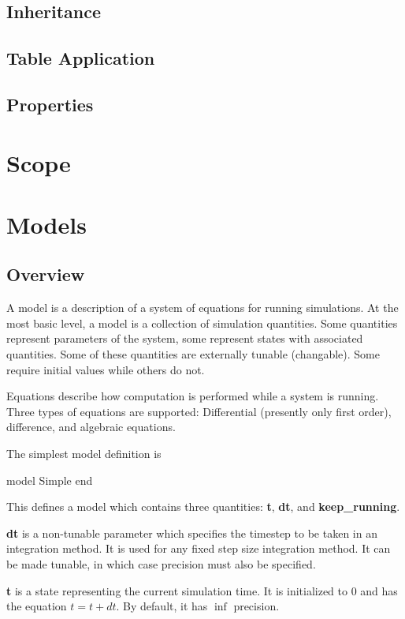 \documentclass[11pt]{article}
\begin{document}
\subsection{Inheritance}
\subsection{Table Application}
\subsection{Properties}
\newpage
\section{Scope}
\newpage
\section {Models}
\subsection{Overview}
A model is a description of a system of equations for running
simulations.  At the most basic level, a model is a collection of
simulation quantities.  Some quantities represent parameters of the
system, some represent states with associated quantities.  Some of
these quantities are externally tunable (changable).  Some require
initial values while others do not.  

Equations describe how computation is performed while a system is
running.  Three types of equations are supported: Differential
(presently only first order), difference, and algebraic equations.

The simplest model definition is 

\begin{dsl}
model Simple
end
\end{dsl}

This defines a model which contains three quantities: {\bf t}, {\bf
dt}, and {\bf keep\_running}.  

{\bf dt} is a non-tunable parameter which specifies the timestep to be
taken in an integration method.  It is used for any fixed step size
integration method.  It can be made tunable, in which case precision
must also be specified.

{\bf t} is a state representing the current simulation time.  It is
initialized to $0$ and has the equation $t = t + dt$.  By default,
it has $\inf$ precision.
\end{document}
